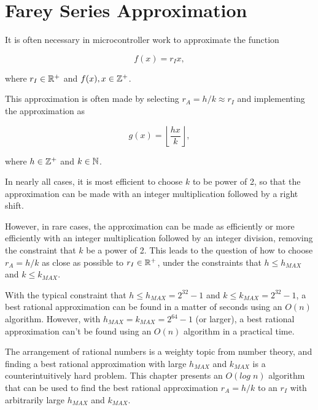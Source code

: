 \chapter{Farey Series Approximation}
\label{crla1}

It is often necessary in microcontroller work to approximate
the function

\begin{equation}
\label{eq:crla1:01}
f(x) = r_I x,
\end{equation}

\noindent{}where $r_I \in {\mathbb{R}^+}$ and $f(x), x \in {\mathbb{Z}^+}$.

This approximation is often made by selecting $r_A = h/k \approx r_I$ and implementing
the approximation as

\begin{equation}
\label{eq:crla1:02}
g(x) = \left\lfloor \frac{hx}{k} \right\rfloor ,
\end{equation}

\noindent{}where $h \in {\mathbb{Z}^+}$ and $k \in {\mathbb{N}}$.

In nearly all cases, it is most efficient to choose $k$ to be power of 2,
so that the approximation can be made with an integer multiplication
followed by a right shift.

However, in rare cases, the approximation can be made as efficiently or
more efficiently with an integer multiplication followed by an integer
division, removing the constraint that $k$ be a power of 2.  This leads to
the question of how to choose $r_A=h/k$ as close as possible to $r_I \in
{\mathbb{R}^+}$, under the constraints that $h \leq h_{MAX}$ and $k
\leq k_{MAX}$.

With the typical constraint that $h \leq h_{MAX} = 2^{32}-1$ and $k \leq
k_{MAX} = 2^{32}-1$, a best rational approximation can be found in a
matter of seconds using an $O(n)$ algorithm.  However, with $h_{MAX} =
k_{MAX} = 2^{64}-1$ (or larger), a best rational approximation can't be
found using an $O(n)$ algorithm in a practical time.

The arrangement of rational numbers is a weighty topic from number theory,
and finding a best rational approximation with large $h_{MAX}$ and
$k_{MAX}$ is a counterintuitively hard problem.  This chapter presents an
$O(log\;n)$ algorithm that can be used to find the best rational
approximation $r_A = h/k$ to an $r_I$ with arbitrarily large $h_{MAX}$ and
$k_{MAX}$.



